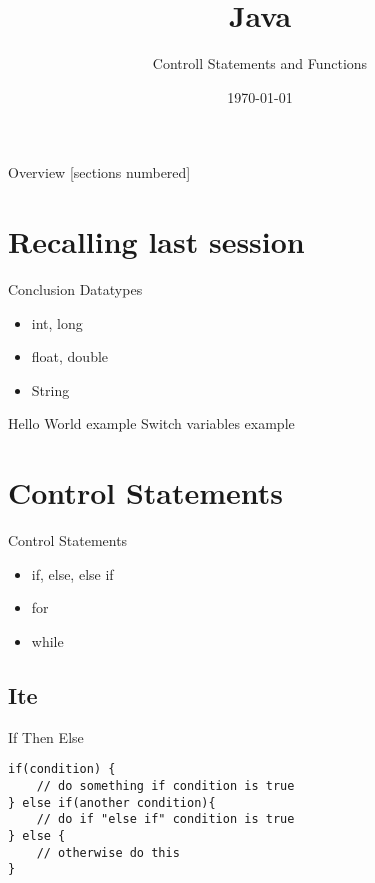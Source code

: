 


\title{Java}
\subtitle{Controll Statements and Functions}
\date{\today}



\begin{frame}
	\titlepage
\end{frame}
\begin{frame}{Overview}
	[sections numbered]
	\tableofcontents
\end{frame}

\section{Recalling last session}
\begin{frame}{Conclusion}
	Datatypes
	\begin{itemize}
		\item int, long
		\item float, double
		\item String
	\end{itemize}
	Hello World example
	Switch variables example
\end{frame}

\section{Control Statements}
\begin{frame}{Control Statements}
	
	\begin{itemize}
		\item if, else, else if
		\item for
		\item while
	\end{itemize}
		
\end{frame}

\subsection{Ite}
\begin{frame}[fragile]{{\huge I}f {\huge T}hen {\huge E}lse}
\begin{lstlisting}
if(condition) {
	// do something if condition is true
} else if(another condition){
	// do if "else if" condition is true 
} else {
	// otherwise do this
}
\end{lstlisting}
\end{frame}

